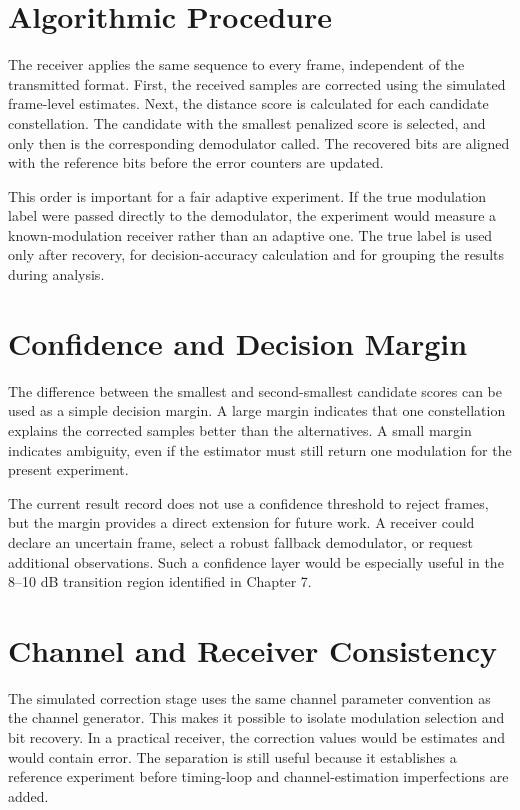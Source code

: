 \documentclass[12pt,twoside,openright]{report}
\begin{document}
\section{Algorithmic Procedure}
The receiver applies the same sequence to every frame, independent of the
transmitted format. First, the received samples are corrected using the
simulated frame-level estimates. Next, the distance score is calculated for
each candidate constellation. The candidate with the smallest penalized
score is selected, and only then is the corresponding demodulator called.
The recovered bits are aligned with the reference bits before the error
counters are updated.

This order is important for a fair adaptive experiment. If the true
modulation label were passed directly to the demodulator, the experiment
would measure a known-modulation receiver rather than an adaptive one. The
true label is used only after recovery, for decision-accuracy calculation
and for grouping the results during analysis.

\section{Confidence and Decision Margin}
The difference between the smallest and second-smallest candidate scores
can be used as a simple decision margin. A large margin indicates that one
constellation explains the corrected samples better than the alternatives.
A small margin indicates ambiguity, even if the estimator must still return
one modulation for the present experiment.

The current result record does not use a confidence threshold to reject
frames, but the margin provides a direct extension for future work. A
receiver could declare an uncertain frame, select a robust fallback
demodulator, or request additional observations. Such a confidence layer
would be especially useful in the 8--10 dB transition region identified in
Chapter 7.

\section{Channel and Receiver Consistency}
The simulated correction stage uses the same channel parameter convention
as the channel generator. This makes it possible to isolate modulation
selection and bit recovery. In a practical receiver, the correction values
would be estimates and would contain error. The separation is still useful
because it establishes a reference experiment before timing-loop and
channel-estimation imperfections are added.
\end{document}
